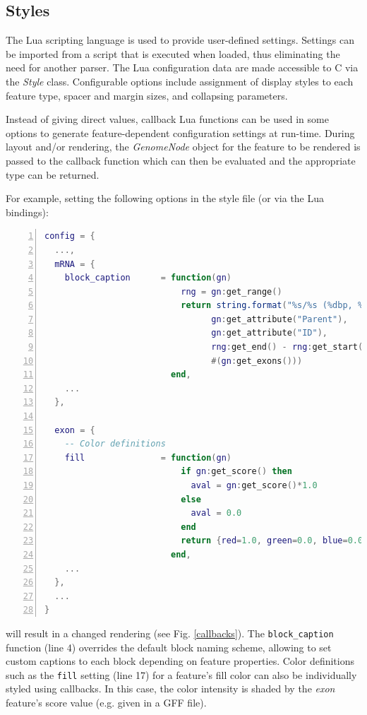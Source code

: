 \documentclass[a4paper]{scrreprt}
\begin{document}
\subsection{Styles}
The Lua scripting language is used to provide
user-defined settings. Settings can be imported from a script that is executed
when loaded, thus eliminating the need for another parser. The Lua configuration
data are made accessible to C via the \emph{Style} class. Configurable options
include assignment of display styles to each feature type, spacer and margin
sizes, and collapsing parameters.

\par Instead of giving direct values, callback Lua functions can be used in some options to generate feature-dependent configuration settings at run-time. During layout and/or rendering, the \emph{GenomeNode} object for the feature to be rendered is passed to the callback function which can then be evaluated and the appropriate type can be returned.
\par For example, setting the following options in the style file (or via the Lua bindings):

\begin{lstlisting}[language=Lua, showstringspaces=false,numbers=left,frame=single]
config = {
  ...,
  mRNA = {
    block_caption      = function(gn)
                           rng = gn:get_range()
                           return string.format("%s/%s (%dbp, %d exons)",
                                 gn:get_attribute("Parent"),
                                 gn:get_attribute("ID"),
                                 rng:get_end() - rng:get_start() + 1,
                                 #(gn:get_exons()))
                         end,
    ...
  },

  exon = {
    -- Color definitions
    fill               = function(gn)
                           if gn:get_score() then
                             aval = gn:get_score()*1.0
                           else
                             aval = 0.0
                           end
                           return {red=1.0, green=0.0, blue=0.0, alpha=aval}
                         end,
    ...
  },
  ...
}

\end{lstlisting}
 will result in a changed rendering (see Fig. \ref{callbacks}). The \texttt{block\_caption} function (line 4) overrides the default block naming scheme, allowing to set custom captions to each block depending on feature properties. Color definitions such as the \texttt{fill} setting (line 17) for a feature's fill color can also be individually styled using callbacks. In this case, the color intensity is shaded by the \emph{exon} feature's score value (e.g. given in a GFF file).
\end{document}
